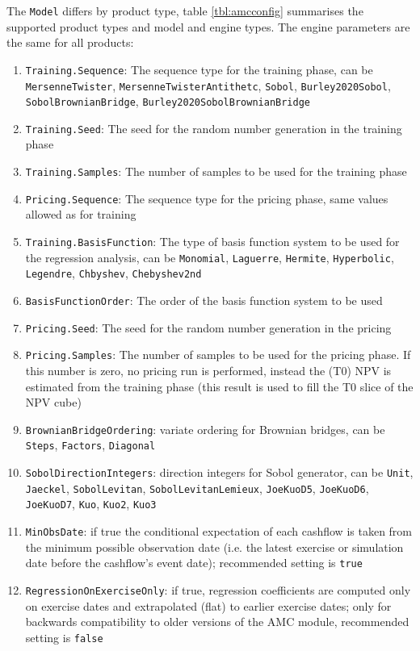 The \verb+Model+ differs by product type, table \ref{tbl:amcconfig} summarises the supported product types and model and
engine types. The engine parameters are the same for all products:

\begin{enumerate}
\item \verb+Training.Sequence+: The sequence type for the training phase, can be \verb+MersenneTwister+,
  \verb+MersenneTwisterAntithetc+, \verb+Sobol+, \verb+Burley2020Sobol+, \verb+SobolBrownianBridge+,
  \verb+Burley2020SobolBrownianBridge+
\item \verb+Training.Seed+: The seed for the random number generation in the training phase
\item \verb+Training.Samples+: The number of samples to be used for the training phase
\item \verb+Pricing.Sequence+: The sequence type for the pricing phase, same values allowed as for training
\item \verb+Training.BasisFunction+: The type of basis function system to be used for the regression analysis, can be
  \verb+Monomial+, \verb+Laguerre+, \verb+Hermite+, \verb+Hyperbolic+, \verb+Legendre+, \verb+Chbyshev+,
  \verb+Chebyshev2nd+
\item \verb+BasisFunctionOrder+: The order of the basis function system to be used
\item \verb+Pricing.Seed+: The seed for the random number generation in the pricing
\item \verb+Pricing.Samples+: The number of samples to be used for the pricing phase. If this number is zero, no pricing
  run is performed, instead the (T0) NPV is estimated from the training phase (this result is used to fill the T0 slice
  of the NPV cube)
\item \verb+BrownianBridgeOrdering+: variate ordering for Brownian bridges, can be \verb+Steps+, \verb+Factors+,
  \verb+Diagonal+
\item \verb+SobolDirectionIntegers+: direction integers for Sobol generator, can be \verb+Unit+, \verb+Jaeckel+,
  \verb+SobolLevitan+, \verb+SobolLevitanLemieux+, \verb+JoeKuoD5+, \verb+JoeKuoD6+, \verb+JoeKuoD7+,
  \verb+Kuo+, \verb+Kuo2+, \verb+Kuo3+
\item \verb+MinObsDate+: if true the conditional expectation of each cashflow is taken from the minimum possible
  observation date (i.e. the latest exercise or simulation date before the cashflow's event date); recommended setting
  is \verb+true+
\item \verb+RegressionOnExerciseOnly+: if true, regression coefficients are computed only on exercise dates and
  extrapolated (flat) to earlier exercise dates; only for backwards compatibility to older versions of the AMC module,
  recommended setting is \verb+false+
\end{enumerate}

